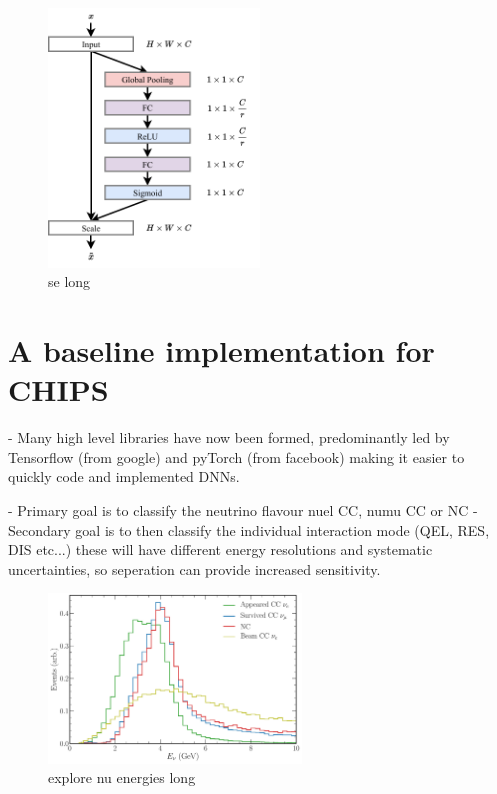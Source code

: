 \begin{figure} %
    \includegraphics[width=0.5\textwidth]{diagrams/7-cvn/se.pdf}
    \caption[se short]
    {se long}
    \label{fig:se}
\end{figure}

\section{A baseline implementation for CHIPS} %
\label{sec:cvn_baseline} %

- Many high level libraries have now been formed, predominantly led by Tensorflow (from google)
and pyTorch (from facebook) making it easier to quickly code and implemented DNNs.

- Primary goal is to classify the neutrino flavour nuel CC, numu CC or NC
- Secondary goal is to then classify the individual interaction mode (QEL, RES, DIS etc...) these
will have different energy resolutions and systematic uncertainties, so seperation can provide
increased sensitivity.

\begin{figure} %
    \includegraphics[width=0.6\textwidth]{diagrams/7-cvn/chipsnet/explore_nu_energies.pdf}
    \caption[explore nu energies short]
    {explore nu energies long}
    \label{fig:explore_nu_energies}
\end{figure}

